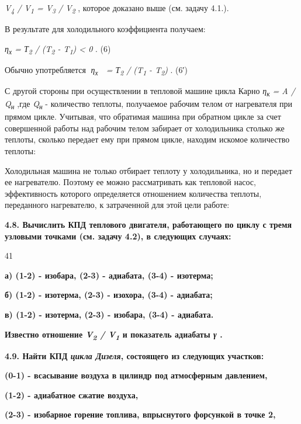 \emph{V\textsubscript{4} / V\textsubscript{1} = V\textsubscript{3} /
V\textsubscript{2}} , которое доказано выше (см. задачу 4.1.).

В результате для холодильного коэффициента получаем:

\emph{η\textsubscript{х} = Т\textsubscript{2} / (T\textsubscript{2} -
T\textsubscript{1}) \textless{} 0} . (6)

Обычно употребляется \emph{η\textsubscript{х}  = Т\textsubscript{2} /
(T\textsubscript{1} - T\textsubscript{2})} . (6′)

С другой стороны при осуществлении в тепловой машине цикла Карно
\emph{η\textsubscript{к} = A / Q\textsubscript{н}} ,где
\emph{Q\textsubscript{н}} - количество теплоты, получаемое рабочим телом
от нагревателя при прямом цикле. Учитывая, что обратимая машина при
обратном цикле за счет совершенной работы над рабочим телом забирает от
холодильника столько же теплоты, сколько передает ему при прямом цикле,
находим искомое количество теплоты:


Холодильная машина не только отбирает теплоту у холодильника, но и
передает ее нагревателю. Поэтому ее можно рассматривать как тепловой
насос, эффективность которого определяется отношением количества
теплоты, переданного нагревателю, к затраченной для этой цели работе:


\textbf{4.8. Вычислить КПД теплового двигателя, работающего по циклу с
тремя узловыми точками (см. задачу 4.2), в следующих случаях:}

41

\textbf{а) (1-2) - изобара, (2-3) - адиабата, (3-4) - изотерма;}

\textbf{б) (1-2) - изотерма, (2-3) - изохора, (3-4) - адиабата;}

\textbf{в) (1-2) - изотерма, (2-3) - изобара, (3-4) - адиабата.}

\textbf{Известно отношение \emph{V\textsubscript{2} /
V\textsubscript{1}} и показатель адиабаты \emph{γ} .}

\textbf{4.9. Найти КПД \emph{цикла Дизеля}, состоящего из следующих
участков:}

\textbf{(0-1) - всасывание воздуха в цилиндр под атмосферным давлением,}

\textbf{(1-2) - адиабатное сжатие воздуха,}

\textbf{(2-3) - изобарное горение топлива, впрыснутого форсункой в точке
2,}

